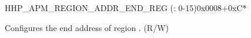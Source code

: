 \begin{register}{H}{HP\_APM\_REGION\_ADDR\_END\_REG (: 0-15)}{0x0008+0xC*}\label{regdesc:HPAPMREGION0ADDRENDREG}
%
\regnewline%
\begin{regdesc}\begin{reglist}
\label{fielddesc:HPAPMREGION0ADDREND}\item [HP\_APM\_REGION\regindex{n}\_ADDR\_END] Configures the end address of region . (R/W)
\end{reglist}\end{regdesc}
\end{register}

































































